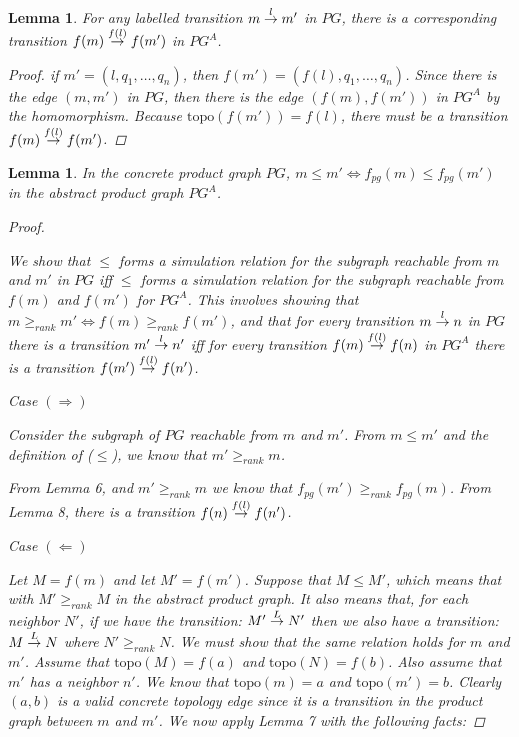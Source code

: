 \documentclass[twocolumn, openany]{sig-alternate-10pt}
\newcommand{\Topo}{\ensuremath{\mathrm{topo}}}
\newtheorem{lem}[thm]{Lemma}
\begin{document}
\begin{lem}
  For any labelled transition $\trans{m}{m'}{l}$ in $PG$, there is a corresponding transition $\trans{f(m)}{f(m')}{f(l)}$ in $PG^A$.
  \begin{proof}
    if $m' = (l, q_1, \ldots, q_n)$, then $f(m') = (f(l), q_1, \ldots, q_n)$. Since there is the edge $(m,m')$ in $PG$, then there is the edge $(f(m),f(m'))$ in $PG^A$ by the homomorphism. Because $\Topo(f(m')) = f(l)$, there must be a transition $\trans{f(m)}{f(m')}{f(l)}$.
  \end{proof}
\end{lem}



\vspace{.4em}
\begin{lem}
  In the concrete product graph $PG$, $m \leq m' \iff f_{pg}(m) \leq f_{pg}(m')$ in the abstract product graph $PG^A$.
  \begin{proof}
    $ $

    \vspace{1em}
    \noindent
    We show that $\leq$ forms a simulation relation for the subgraph reachable from $m$ and $m'$ in $PG$ iff $\leq$ forms a simulation relation for the subgraph reachable from $f(m)$ and $f(m')$ for $PG^A$. This involves showing that $m \geq_{rank} m' \iff f(m) \geq_{rank} f(m')$, and that 
    for every transition $\trans{m}{n}{l}$ in $PG$ there is a transition $\trans{m'}{n'}{l}$ iff for every transition $\trans{f(m)}{f(n)}{f(l)}$ in $PG^A$ there is a transition $\trans{f(m')}{f(n')}{f(l)}$.

    \vspace{1em}
    \noindent
    \emph{Case} $(\Rightarrow)$

    \vspace{.4em}
    Consider the subgraph of $PG$ reachable from $m$ and $m'$. From $m \leq m'$ and the definition of ($\leq$), we know that $m' \geq_{rank} m$. 

    \noindent
    From Lemma 6, and $m' \geq_{rank} m$ we know that $f_{pg}(m') \geq_{rank} f_{pg}(m)$. 
    From Lemma 8, there is a transition $\trans{f(n)}{f(n')}{f(l)}$.

    \vspace{1.2em}
    \noindent
    \emph{Case} $(\Leftarrow)$

    \vspace{.4em}
    Let $M = f(m)$ and let $M' = f(m')$.
    Suppose that $M \leq M'$, which means that with $M' \geq_{rank} M$ in the abstract product graph. It also means that, for each neighbor $N'$, if we have the transition: $\trans{M'}{N'}{L}$ then we also have a transition: $\trans{M}{N}{L}$ where $N' \geq_{rank} N$. We must show that the same relation holds for $m$ and $m'$. 
    Assume that $\Topo(M) = f(a)$ and $\Topo(N) = f(b)$. Also assume that $m'$ has a neighbor $n'$. We know that $\Topo(m) = a$ and $\Topo(m') = b$. Clearly $(a,b)$ is a valid concrete topology edge since it is a transition in the product graph between $m$ and $m'$. We now apply Lemma 7 with the following facts:


\end{proof}
\end{lem}
\end{document}
